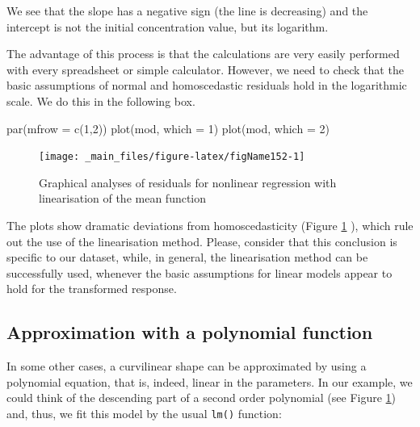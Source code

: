\documentclass[a4paper,12pt,oneside]{book}
\newenvironment{Shaded}{\begin{snugshade}}{\end{snugshade}}
\newcommand{\DecValTok}[1]{#1}
\newcommand{\FunctionTok}[1]{#1}
\newcommand{\AttributeTok}[1]{#1}
\newcommand{\NormalTok}[1]{#1}
\begin{document}
We see that the slope has a negative sign (the line is decreasing) and the intercept is not the initial concentration value, but its logarithm.

The advantage of this process is that the calculations are very easily performed with every spreadsheet or simple calculator. However, we need to check that the basic assumptions of normal and homoscedastic residuals hold in the logarithmic scale. We do this in the following box.

\begin{Shaded}
\begin{Highlighting}[]
\FunctionTok{par}\NormalTok{(}\AttributeTok{mfrow =} \FunctionTok{c}\NormalTok{(}\DecValTok{1}\NormalTok{,}\DecValTok{2}\NormalTok{))}
\FunctionTok{plot}\NormalTok{(mod, }\AttributeTok{which =} \DecValTok{1}\NormalTok{)}
\FunctionTok{plot}\NormalTok{(mod, }\AttributeTok{which =} \DecValTok{2}\NormalTok{)}
\end{Highlighting}
\end{Shaded}

\begin{figure}

{\centering \texttt{[image: \_main\_files/figure-latex/figName152-1]} 

}

\caption{Graphical analyses of residuals for nonlinear regression with linearisation of the mean function}\label{fig:figName152}
\end{figure}

The plots show dramatic deviations from homoscedasticity (Figure \ref{fig:figName152} ), which rule out the use of the linearisation method. Please, consider that this conclusion is specific to our dataset, while, in general, the linearisation method can be successfully used, whenever the basic assumptions for linear models appear to hold for the transformed response.

\hypertarget{approximation-with-a-polynomial-function}{%
\subsection{Approximation with a polynomial function}\label{approximation-with-a-polynomial-function}}

In some other cases, a curvilinear shape can be approximated by using a polynomial equation, that is, indeed, linear in the parameters. In our example, we could think of the descending part of a second order polynomial (see Figure \ref{fig:figName152}) and, thus, we fit this model by the usual \texttt{lm()} function:
\end{document}
